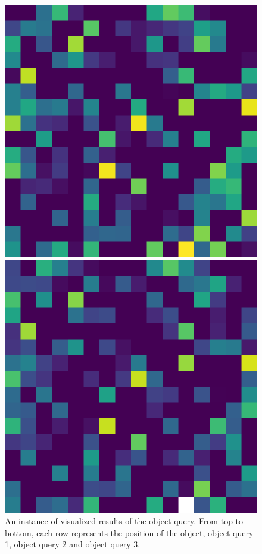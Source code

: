 \begin{figure}[h!]
{	\begin{minipage}[t]{3.5cm}
	\centering
	\includegraphics[width=0.9\linewidth]{figures/result/street/q2_3}
	\end{minipage}
	\begin{minipage}[t]{3.5cm}
	\centering
	\includegraphics[width=0.9\linewidth]{figures/result/street/q2_4}
	\end{minipage}}

	\caption[An instance of Visualized results of the object query]{An instance of visualized results of the object query. From top to bottom, each row represents the position of the object, object query 1, object query 2 and object query 3.}
	\label{fig:tennis}
\end{figure}

